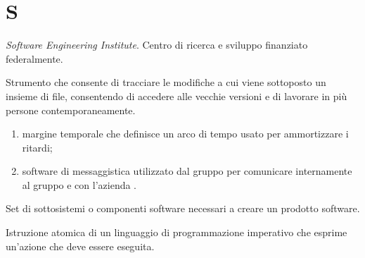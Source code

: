 \section{S}

\textit{Software Engineering Institute}. Centro di ricerca e sviluppo finanziato federalmente.

Strumento che consente di tracciare le modifiche a cui viene sottoposto un insieme di file, consentendo di accedere alle vecchie versioni e di lavorare in più persone contemporaneamente.

\begin{enumerate}
	\item margine temporale che definisce un arco di tempo usato per ammortizzare i ritardi;
	\item software di messaggistica utilizzato dal gruppo \zephyrus{} per comunicare internamente al gruppo e con l'azienda \riskapp.
\end{enumerate}

Set di sottosistemi o componenti software necessari a creare un prodotto software.

Istruzione atomica di un linguaggio di programmazione imperativo che esprime un'azione che deve essere eseguita.
